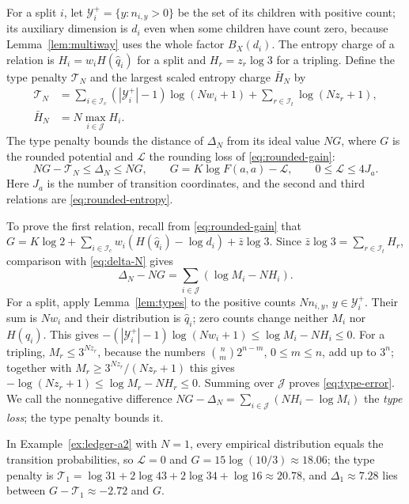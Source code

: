 For a split \(i\), let \(\mathcal Y_i^+=\{y:n_{i,y}>0\}\) be the set of
its children with positive count; its auxiliary dimension is \(d_i\) even
when some children have count zero, because Lemma~\ref{lem:multiway} uses
the whole factor \(B_X(d_i)\). The entropy charge of a relation is
\(H_i=w_iH(\hat q_i)\) for a split and \(H_r=z_r\log3\) for a tripling.
Define the type penalty \(\mathcal T_N\) and the largest scaled entropy
charge \(\bar H_N\) by
\begin{equation}\label{eq:type-penalty}
 \begin{split}
 \mathcal T_N&=\sum_{i\in\mathcal I_c}(|\mathcal Y_i^+|-1)\log(Nw_i+1)
             +\sum_{r\in\mathcal I_t}\log(Nz_r+1),\\
 \bar H_N&=N\max_{i\in\mathcal J}H_i.
 \end{split}
\end{equation}
The type penalty bounds the distance of \(\Delta_N\) from its ideal value
\(NG\), where \(G\) is the rounded potential and \(\mathcal L\) the
rounding loss of \eqref{eq:rounded-gain}:
\begin{equation}\label{eq:type-error}
 NG-\mathcal T_N\le\Delta_N\le NG,
 \qquad G=K\log F(a,a)-\mathcal L,
 \qquad 0\le\mathcal L\le4J_a.
\end{equation}
Here \(J_a\) is the number of transition coordinates, and the second and
third relations are \eqref{eq:rounded-entropy}.

To prove the first relation, recall from \eqref{eq:rounded-gain} that
\(G=K\log2+\sum_{i\in\mathcal I_c}w_i(H(\hat q_i)-\log d_i)+\bar z\log3\).
Since \(\bar z\log3=\sum_{r\in\mathcal I_t}H_r\), comparison with
\eqref{eq:delta-N} gives
\[
 \Delta_N-NG=\sum_{i\in\mathcal J}(\log M_i-NH_i).
\]
For a split, apply Lemma~\ref{lem:types} to the positive counts
\(Nn_{i,y}\), \(y\in\mathcal Y_i^+\). Their sum is \(Nw_i\) and their
distribution is \(\hat q_i\); zero counts change neither \(M_i\) nor
\(H(\hat q_i)\). This gives
\(-(|\mathcal Y_i^+|-1)\log(Nw_i+1)\le\log M_i-NH_i\le0\). For a tripling,
\(M_r\le3^{Nz_r}\), because the numbers \(\binom nm2^{n-m}\),
\(0\le m\le n\), add up to \(3^n\); together with
\(M_r\ge3^{Nz_r}/(Nz_r+1)\) this gives
\(-\log(Nz_r+1)\le\log M_r-NH_r\le0\). Summing over \(\mathcal J\) proves
\eqref{eq:type-error}. We call the nonnegative difference
\(NG-\Delta_N=\sum_{i\in\mathcal J}(NH_i-\log M_i)\) the \emph{type loss};
the type penalty bounds it.

In Example~\ref{ex:ledger-a2} with \(N=1\), every empirical distribution
equals the transition probabilities, so \(\mathcal L=0\) and
\(G=15\log(10/3)\approx18.06\); the type penalty is
\(\mathcal T_1=\log31+2\log43+2\log34+\log16\approx20.78\), and
\(\Delta_1\approx7.28\) lies between \(G-\mathcal T_1\approx-2.72\) and
\(G\).

